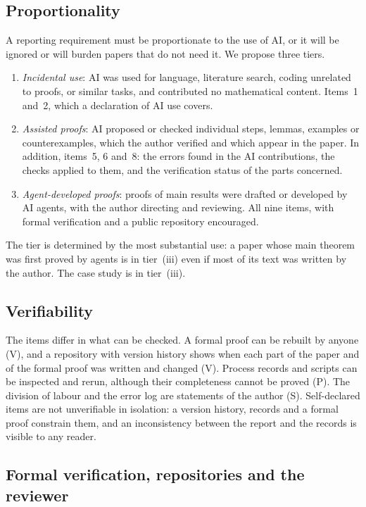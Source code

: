 \subsection{Proportionality}\label{sec:std-tiers}

A reporting requirement must be proportionate to the use of AI, or it will be ignored or will burden papers that do
not need it. We propose three tiers.
\begin{enumerate}[label=(\roman*)]
\item \emph{Incidental use}: AI was used for language, literature search, coding unrelated to proofs, or similar
  tasks, and contributed no mathematical content. Items~1 and~2, which a declaration of AI use covers.
\item \emph{Assisted proofs}: AI proposed or checked individual steps, lemmas, examples or counterexamples, which
  the author verified and which appear in the paper. In addition, items~5, 6 and~8: the errors found in the AI
  contributions, the checks applied to them, and the verification status of the parts concerned.
\item \emph{Agent-developed proofs}: proofs of main results were drafted or developed by AI agents, with the
  author directing and reviewing. All nine items, with formal verification and a public repository encouraged.
\end{enumerate}
The tier is determined by the most substantial use: a paper whose main theorem was first proved by agents is in
tier~(iii) even if most of its text was written by the author. The case study is in tier~(iii).

\subsection{Verifiability}\label{sec:std-verify}

The items differ in what can be checked. A formal proof can be rebuilt by anyone (V), and a repository with
version history shows when each part of the paper and of the formal proof was written and changed (V). Process
records and scripts can be inspected and rerun, although their completeness cannot be proved (P). The division of
labour and the error log are statements of the author (S). Self-declared items are not unverifiable in isolation:
a version history, records and a formal proof constrain them, and an inconsistency between the report and the
records is visible to any reader.

\subsection{Formal verification, repositories and the reviewer}\label{sec:std-repo}

